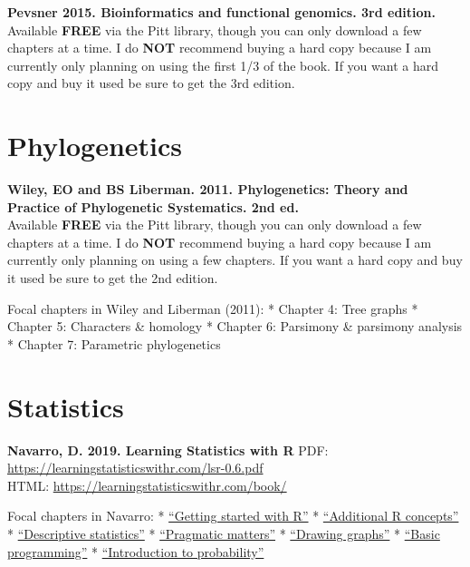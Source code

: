 \documentclass[
]{book}
\begin{document}
\textbf{Pevsner 2015. Bioinformatics and functional genomics. 3rd edition.}\\
Available \textbf{FREE} via the Pitt library, though you can only download a few chapters at a time. I do \textbf{NOT} recommend buying a hard copy because I am currently only planning on using the first 1/3 of the book. If you want a hard copy and buy it used be sure to get the 3rd edition.

\hypertarget{phylogenetics}{%
\section{Phylogenetics}\label{phylogenetics}}

\textbf{Wiley, EO and BS Liberman. 2011. Phylogenetics: Theory and Practice of Phylogenetic Systematics. 2nd ed.}\\
Available \textbf{FREE} via the Pitt library, though you can only download a few chapters at a time. I do \textbf{NOT} recommend buying a hard copy because I am currently only planning on using a few chapters. If you want a hard copy and buy it used be sure to get the 2nd edition.

Focal chapters in Wiley and Liberman (2011):
* Chapter 4: Tree graphs
* Chapter 5: Characters \& homology
* Chapter 6: Parsimony \& parsimony analysis
* Chapter 7: Parametric phylogenetics

\hypertarget{statistics}{%
\section{Statistics}\label{statistics}}

\textbf{Navarro, D. 2019. Learning Statistics with R}
PDF: \url{https://learningstatisticswithr.com/lsr-0.6.pdf}\\
HTML: \url{https://learningstatisticswithr.com/book/}

Focal chapters in Navarro:
* \href{https://learningstatisticswithr.com/book/introR.html}{``Getting started with R''}
* \href{https://learningstatisticswithr.com/book/mechanics.html}{``Additional R concepts''}
* \href{https://learningstatisticswithr.com/book/descriptives.html}{``Descriptive statistics''}
* \href{https://learningstatisticswithr.com/book/datahandling.html}{``Pragmatic matters''}
* \href{https://learningstatisticswithr.com/book/graphics.html\#hist}{``Drawing graphs''}
* \href{https://learningstatisticswithr.com/book/scripting.html}{``Basic programming''}
* \href{https://learningstatisticswithr.com/book/probability.html}{``Introduction to probability''}
\end{document}
